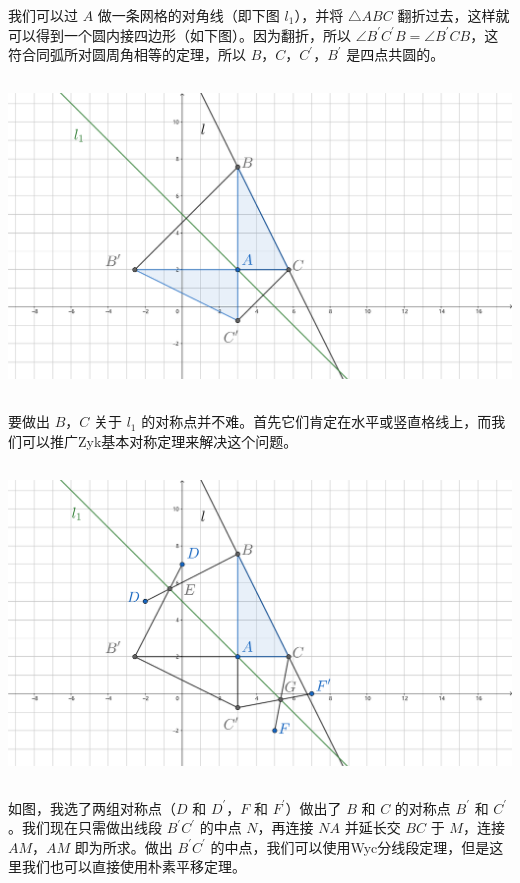 \documentclass[UTF8]{article}
\begin{document}
我们可以过 \(A\) 做一条网格的对角线（即下图 \(l_{1}\)），并将
\(\bigtriangleup ABC\)
翻折过去，这样就可以得到一个圆内接四边形（如下图）。因为翻折，所以
\(\angle B^{'}C^{'}B = \angle B^{'}CB\)，这符合同弧所对圆周角相等的定理，所以
\(B\)，\(C\)，\(C^{'}\)，\(B^{'}\) 是四点共圆的。

\includegraphics[width=5.76806in,height=3.27847in]{media/image51.png}

要做出 \(B\)，\(C\) 关于 \(l_{1}\)
的对称点并不难。首先它们肯定在水平或竖直格线上，而我们可以推广Zyk基本对称定理来解决这个问题。

\includegraphics[width=5.76806in,height=3.27847in]{media/image52.png}

如图，我选了两组对称点（\(D\) 和 \(D^{'}\)，\(F\) 和 \(F^{'}\)）做出了
\(B\) 和 \(C\) 的对称点 \(B^{'}\) 和 \(C^{'}\)。我们现在只需做出线段
\(B^{'}C^{'}\) 的中点 \(N\)，再连接 \(NA\) 并延长交 \(BC\) 于
\(M\)，连接 \(AM\)，\(AM\) 即为所求。做出 \(B^{'}C^{'}\)
的中点，我们可以使用Wyc分线段定理，但是这里我们也可以直接使用朴素平移定理。
\end{document}
